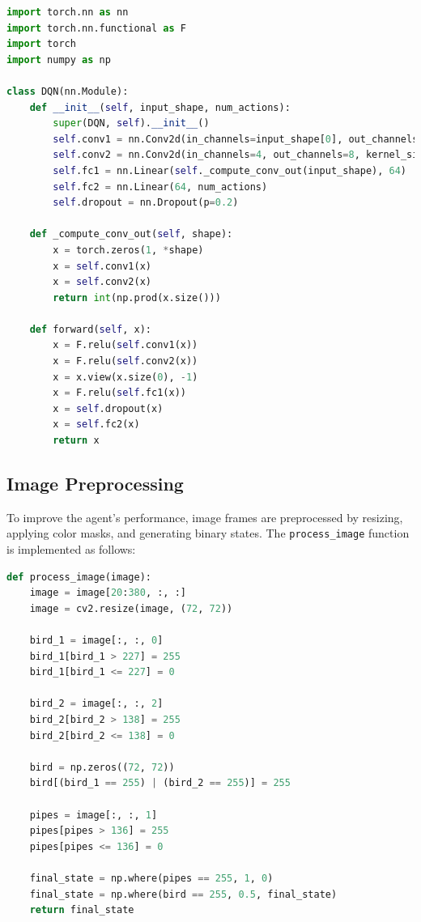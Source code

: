 \documentclass[a4paper,12pt]{article}
\begin{document}
\begin{lstlisting}[language=Python, caption=DQN Architecture]
import torch.nn as nn
import torch.nn.functional as F
import torch
import numpy as np

class DQN(nn.Module):
    def __init__(self, input_shape, num_actions):
        super(DQN, self).__init__()
        self.conv1 = nn.Conv2d(in_channels=input_shape[0], out_channels=4, kernel_size=8, stride=4)
        self.conv2 = nn.Conv2d(in_channels=4, out_channels=8, kernel_size=4, stride=2)
        self.fc1 = nn.Linear(self._compute_conv_out(input_shape), 64)
        self.fc2 = nn.Linear(64, num_actions)
        self.dropout = nn.Dropout(p=0.2)

    def _compute_conv_out(self, shape):
        x = torch.zeros(1, *shape)
        x = self.conv1(x)
        x = self.conv2(x)
        return int(np.prod(x.size()))

    def forward(self, x):
        x = F.relu(self.conv1(x))
        x = F.relu(self.conv2(x))
        x = x.view(x.size(0), -1)
        x = F.relu(self.fc1(x))
        x = self.dropout(x)
        x = self.fc2(x)
        return x
\end{lstlisting}

\subsection{Image Preprocessing}
To improve the agent's performance, image frames are preprocessed by resizing, applying color masks, and generating binary states. The \texttt{process\_image} function is implemented as follows:

\begin{lstlisting}[language=Python, caption=Image Preprocessing]
def process_image(image):
    image = image[20:380, :, :]
    image = cv2.resize(image, (72, 72))

    bird_1 = image[:, :, 0]
    bird_1[bird_1 > 227] = 255
    bird_1[bird_1 <= 227] = 0

    bird_2 = image[:, :, 2]
    bird_2[bird_2 > 138] = 255
    bird_2[bird_2 <= 138] = 0

    bird = np.zeros((72, 72))
    bird[(bird_1 == 255) | (bird_2 == 255)] = 255

    pipes = image[:, :, 1]
    pipes[pipes > 136] = 255
    pipes[pipes <= 136] = 0

    final_state = np.where(pipes == 255, 1, 0)
    final_state = np.where(bird == 255, 0.5, final_state)
    return final_state
\end{lstlisting}
\end{document}

